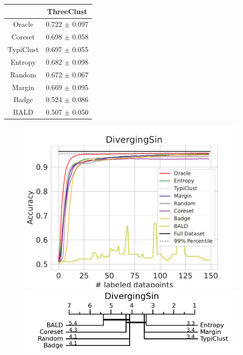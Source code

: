 \documentclass[]{article}
\begin{document}
\begin{minipage}{0.29\linewidth}
\begin{tabular}{c|c}
&ThreeClust \\
\hline
Oracle&0.722 $\pm$ 0.097\\
Coreset&0.698 $\pm$ 0.058\\
TypiClust&0.697 $\pm$ 0.055\\
Entropy&0.682 $\pm$ 0.098\\
Random&0.672 $\pm$ 0.067\\
Margin&0.669 $\pm$ 0.095\\
Badge&0.524 $\pm$ 0.086\\
BALD&0.507 $\pm$ 0.050\\
\end{tabular}
\end{minipage}
\begin{minipage}{0.65\linewidth}
\begin{figure}[H]
    \centering
\includegraphics[width=\linewidth]{img/eval_divergingsin.pdf} \\[2mm]
\includegraphics[width=\linewidth]{img/micro_divsin.jpg}
\end{figure}
\end{minipage}
\end{document}
